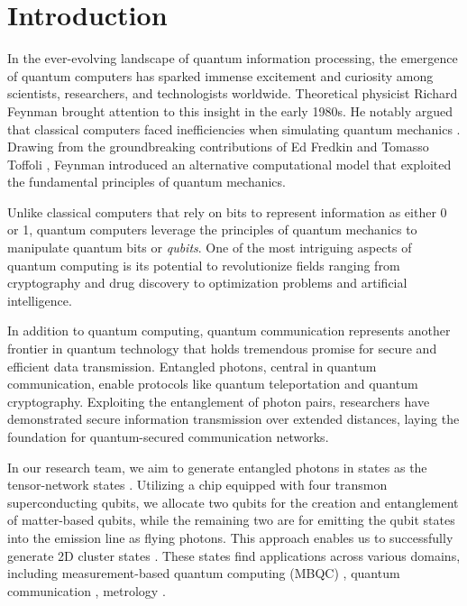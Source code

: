 \chapter*{Introduction}
\label{chap:intro}

\pagestyle{fancy}
\thispagestyle{fancy}

In the ever-evolving landscape of quantum information processing, the emergence of quantum computers has sparked immense excitement and curiosity among scientists, researchers, and technologists worldwide.
Theoretical physicist Richard Feynman brought attention to this insight in the early 1980s.
He notably argued that classical computers faced inefficiencies when simulating quantum mechanics \cite{Feynman}. 
Drawing from the groundbreaking contributions of Ed Fredkin and Tomasso Toffoli \cite{Ed_tommy}, Feynman introduced an alternative computational model that exploited the fundamental principles of quantum mechanics.

Unlike classical computers that rely on bits to represent information as either 0 or 1, quantum computers leverage the principles of quantum mechanics to manipulate quantum bits or \emph{qubits}.
One of the most intriguing aspects of quantum computing is its potential to revolutionize fields ranging from cryptography and drug discovery to optimization problems and artificial intelligence.

In addition to quantum computing, quantum communication \cite{Quantum_communication} represents another frontier in quantum technology that holds tremendous promise for secure and efficient data transmission.
Entangled photons, central in quantum communication, enable protocols like quantum teleportation \cite{Quantum_teleportation} and quantum cryptography. 
Exploiting the entanglement of photon pairs, researchers have demonstrated secure information transmission over extended distances, laying the foundation for quantum-secured communication networks.

In our research team, we aim to generate entangled photons in states as the tensor-network states \cite{tensor_networks}.
Utilizing a chip equipped with four transmon superconducting qubits, we allocate two qubits for the creation and entanglement of matter-based qubits, while the remaining two are for emitting the qubit states into the emission line as flying photons. 
This approach enables us to successfully generate 2D cluster states \cite{HernandezAnton2023}.
These states find applications across various domains, including measurement-based quantum computing (MBQC) \cite{MBQC, MBQC_3}, quantum communication \cite{Quantum_communication}, metrology \cite{metrology}.

